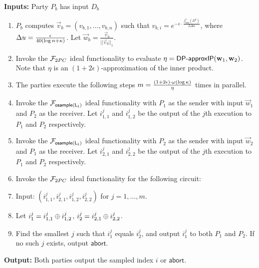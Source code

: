 \label{prot:prodsampdp}
\begin{algorithm}[htbp]
\textbf{Inputs:} Party $P_b$ has input $D_b$   

\begin{enumerate}
    \item $P_b$ computes $\vec{v}_b = (v_{b, 1}, \ldots, v_{b,n})$ such
    that ${v}_{b,i} = e^{-\epsilon \cdot
    \frac{f^{c_i}_{\mathsf{loss}}(D^b)}{2 \Delta u}}$, where $\Delta u =
    \frac{\epsilon}{40(\log n + \kappa)}$. 
    Let $\vec{w}_{b}=\frac{\vec{v}_{b}}{||\vec{v}_b||_1}$.
    
    \item Invoke the $\mathcal{F}_{2PC}$ ideal functionality to evaluate $\eta = {\mathsf{DP}\mbox{-}\mathsf{approxIP}}(\mathbf{w}_1,
    \mathbf{w}_2)$.  Note that $\eta$ is an $(1+2\epsilon)$-approximation of the inner product.
    
    \item The parties execute the following steps $m=\frac{(1+2\epsilon) \cdot
    \omega(\log{\kappa})}{\eta}$ times in parallel.
    
    \BEN \item Invoke the $\mathcal{F}_{\mathsf{osample(L_1)}}$ ideal functionality with $P_1$ as the sender with input
    $\vec{w}_1$ and $P_2$ as the receiver.  Let $i_{1,1}^j$ and
    $i_{1,2}^j$ be the output of the $j$th execution to $P_1$ and $P_2$
    respectively. 
    
    \item Invoke the $\mathcal{F}_{\mathsf{osample(L_1)}}$ ideal functionality with $P_2$ as the sender with input
    $\vec{w}_2$ and $P_1$ as the receiver.  Let $i_{2,1}^j$ and
    $i_{2,2}^j$ be the output of the $j$th execution to $P_1$ and $P_2$
    respectively.
    
    \EEN
    
    \item Invoke the $\mathcal{F}_{2PC}$ ideal functionality for the following circuit: 
      \BEN
      \item[] \hspace{-2em} Input: $(i_{1,1}^j, i_{2,1}^j, i_{1,2}^j, i_{2,2}^j)$ for $j = 1, \ldots, m$. 
      \item Let $i_1^j = i_{1,1}^j \oplus i_{1,2}^j$, $i_2^j = i_{2,1}^j \oplus i_{2,2}^j$. 
      \item Find the smallest $j$ such that $i_1^j$ equals $i_2^j$, and
      output $i_1^j$ to both $P_1$ and $P_2$.  If no such $j$ exists,
      output $\mathsf{abort}$.  \EEN

\end{enumerate}
\textbf{Output:} Both parties output the sampled index $i$ or $\mathsf{abort}$. 

\caption{Exponential Mechanism Protocol ($\Pi_{\mathsf{EM}}$) in the $\{\F_{2PC}, \F_\oslone \}$-hybrid model}
\end{algorithm}



